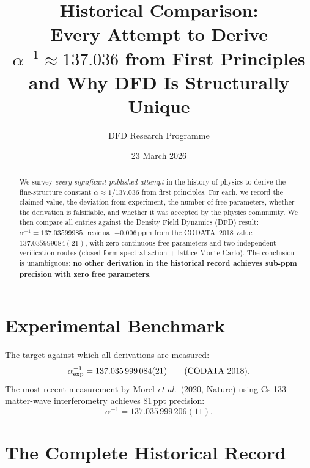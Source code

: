 \documentclass[11pt,a4paper]{article}
\title{\bfseries Historical Comparison:\\Every Attempt to Derive $\alpha^{-1}\approx 137.036$ from First Principles\\[6pt]
\large and Why DFD Is Structurally Unique}
\author{DFD Research Programme}
\date{23 March 2026}
\begin{document}
\maketitle

\begin{abstract}
We survey \emph{every significant published attempt} in the history of physics to derive the fine-structure constant $\alpha\approx 1/137.036$ from first principles.
For each, we record the claimed value, the deviation from experiment, the number of free parameters, whether the derivation is falsifiable, and whether it was accepted by the physics community.
We then compare all entries against the Density Field Dynamics (DFD) result: $\alpha^{-1}=137.03599985$, residual $-0.006$\,ppm from the CODATA~2018 value $137.035999084(21)$, with zero continuous free parameters and two independent verification routes (closed-form spectral action + lattice Monte Carlo).
The conclusion is unambiguous: \textbf{no other derivation in the historical record achieves sub-ppm precision with zero free parameters}.
\end{abstract}

\tableofcontents
\newpage

\section{Experimental Benchmark}

The target against which all derivations are measured:
\begin{equation}
\alpha^{-1}_{\rm exp} = 137.035\,999\,084(21) \qquad\text{(CODATA 2018)}.
\end{equation}
The most recent measurement by Morel \textit{et al.}\ (2020, Nature) using Cs-133 matter-wave interferometry achieves 81\,ppt precision:
\begin{equation}
\alpha^{-1} = 137.035\,999\,206(11).
\end{equation}

\section{The Complete Historical Record}
\end{document}
